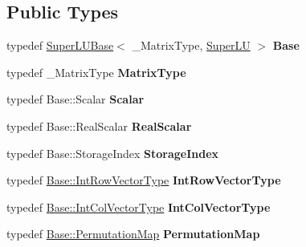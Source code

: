 \subsection*{Public Types}
\begin{DoxyCompactItemize}
\item 
\mbox{\label{class_eigen_1_1_super_l_u_a929eb972e66899842fda1b5f8c65426e}} 
typedef \mbox{\hyperlink{class_eigen_1_1_super_l_u_base}{Super\+L\+U\+Base}}$<$ \+\_\+\+Matrix\+Type, \mbox{\hyperlink{class_eigen_1_1_super_l_u}{Super\+LU}} $>$ {\bfseries Base}
\item 
\mbox{\label{class_eigen_1_1_super_l_u_a51df2ad6aa0b68c454390de0debc6a45}} 
typedef \+\_\+\+Matrix\+Type {\bfseries Matrix\+Type}
\item 
\mbox{\label{class_eigen_1_1_super_l_u_afab08072ca82cecde94fec93944bf01b}} 
typedef Base\+::\+Scalar {\bfseries Scalar}
\item 
\mbox{\label{class_eigen_1_1_super_l_u_a4b4d945d871a721ef24b3b6f51812f15}} 
typedef Base\+::\+Real\+Scalar {\bfseries Real\+Scalar}
\item 
\mbox{\label{class_eigen_1_1_super_l_u_a16513872355abbb0efa674592142a0f7}} 
typedef Base\+::\+Storage\+Index {\bfseries Storage\+Index}
\item 
\mbox{\label{class_eigen_1_1_super_l_u_ae44702f0150e31120ee366d1e2494ca8}} 
typedef \mbox{\hyperlink{class_eigen_1_1_matrix}{Base\+::\+Int\+Row\+Vector\+Type}} {\bfseries Int\+Row\+Vector\+Type}
\item 
\mbox{\label{class_eigen_1_1_super_l_u_a2b1324b63ee0d4e7e3cb8cbb0791830c}} 
typedef \mbox{\hyperlink{class_eigen_1_1_matrix}{Base\+::\+Int\+Col\+Vector\+Type}} {\bfseries Int\+Col\+Vector\+Type}
\item 
\mbox{\label{class_eigen_1_1_super_l_u_ae3e1cde5c9d38ce077af4e97109131ee}} 
typedef \mbox{\hyperlink{class_eigen_1_1_map}{Base\+::\+Permutation\+Map}} {\bfseries Permutation\+Map}
\item 

\end{DoxyCompactItemize}
